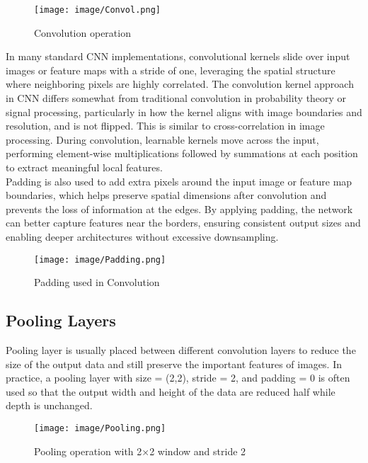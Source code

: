 \documentclass[conference]{IEEEtran}
\begin{document}
\begin{figure}[htbp]
\centerline{\texttt{[image: image/Convol.png]}}
\caption{Convolution operation}
\label{fig:convolution}
\end{figure}

In many standard CNN implementations, convolutional kernels slide over input images or feature maps with a stride of one, leveraging the spatial structure where neighboring pixels are highly correlated. The convolution kernel approach in CNN differs somewhat from traditional convolution in probability theory or signal processing, particularly in how the kernel aligns with image boundaries and resolution, and is not flipped. This is similar to cross-correlation in image processing. During convolution, learnable kernels move across the input, performing element-wise multiplications followed by summations at each position to extract meaningful local features.\\

\noindent Padding is also used to add extra pixels around the input image or feature map boundaries, which helps preserve spatial dimensions after convolution and prevents the loss of information at the edges. By applying padding, the network can better capture features near the borders, ensuring consistent output sizes and enabling deeper architectures without excessive downsampling.

\begin{figure}[htbp]
\centerline{\texttt{[image: image/Padding.png]}}
\caption{Padding used in Convolution}
\label{fig:padding}
\end{figure}

\subsection{Pooling Layers}
Pooling layer is usually placed between different convolution layers to reduce the size of the output data and still preserve the important features of images. In practice, a pooling layer with size = (2,2), stride = 2, and padding = 0 is often used so that the output width and height of the data are reduced half while depth is unchanged.

\begin{figure}[htbp]
\centerline{\texttt{[image: image/Pooling.png]}}
\caption{Pooling operation with 2×2 window and stride 2}
\label{fig:pooling}
\end{figure}
\end{document}
